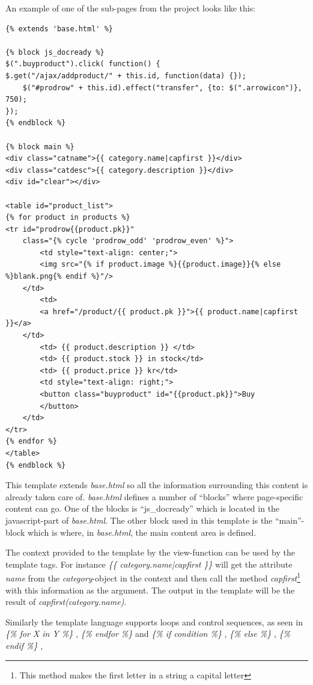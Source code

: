 \documentclass[12pt, a4paper,titlepage]{article}
\begin{document}
An example of one of the sub-pages from the project looks like this:
\lstset{language=HTML}
\begin{lstlisting}
{% extends 'base.html' %}

{% block js_docready %}
$(".buyproduct").click( function() {
$.get("/ajax/addproduct/" + this.id, function(data) {}); 
    $("#prodrow" + this.id).effect("transfer", {to: $(".arrowicon")}, 750);
});
{% endblock %}
 
{% block main %}
<div class="catname">{{ category.name|capfirst }}</div>
<div class="catdesc">{{ category.description }}</div>
<div id="clear"></div>

<table id="product_list">
{% for product in products %}
<tr id="prodrow{{product.pk}}" 
    class="{% cycle 'prodrow_odd' 'prodrow_even' %}">
        <td style="text-align: center;">
		<img src="{% if product.image %}{{product.image}}{% else %}blank.png{% endif %}"/>
	</td>
        <td>
		<a href="/product/{{ product.pk }}">{{ product.name|capfirst }}</a>
	</td>
        <td> {{ product.description }} </td>
        <td> {{ product.stock }} in stock</td>
        <td> {{ product.price }} kr</td>
        <td style="text-align: right;">
		<button class="buyproduct" id="{{product.pk}}">Buy
		</button>
	</td>
</tr>
{% endfor %}
</table>
{% endblock %}
\end{lstlisting}
\lstset{language=Python}
This template extends \emph{base.html} so all the information surrounding
this content is already taken care of. \emph{base.html} defines a number of
``blocks'' where page-specific content can go. One of the blocks is
``js\_docready'' which is located in the javascript-part of \emph{base.html}.
The other block used in this template is the ``main''-block which is where, 
in \emph{base.html}, the main content area is defined.

The context provided to the template by the view-function can be used by the
template tags. For instance \emph{ \{\{ category.name|capfirst \}\} } will
get the attribute \emph{name} from the \emph{category}-object in the context
and then call the method \emph{capfirst}\footnote{This method makes the
first letter in a string a capital letter} with this information as the
argument. The output in the template will be the result of 
\emph{capfirst(category.name)}.

Similarly the template language supports loops and control sequences, as seen
in \emph{ \{\% for X in Y \%\} }, \emph{ \{\% endfor \%\} } and
\emph{ \{\% if condition \%\} }, \emph{ \{\% else \%\} }, \emph{ \{\% endif \%\} }, 
\end{document}
